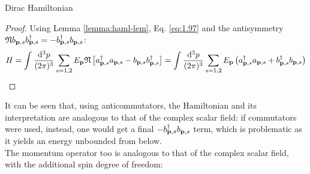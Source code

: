 \begin{proposition}{Dirac Hamiltonian}{}
\begin{proof}
    Using Lemma \ref{lemma:haml-lem}, Eq. \ref{eq:1.97} and the antisymmetry $ \mathfrak{N} b_{\mathbf{p},s} b_{\mathbf{p},s}^\dagger = - b_{\mathbf{p},s}^\dagger b_{\mathbf{p},s} $:
    \begin{equation*}
      H = \int \frac{\mathrm{d}^3p}{(2\pi)^3} \sum_{s = 1,2} E_{\mathbf{p}} \mathfrak{N} \left[ a_{\mathbf{p},s}^\dagger a_{\mathbf{p},s} - b_{\mathbf{p},s} b_{\mathbf{p},s}^\dagger \right] = \int \frac{\mathrm{d}^3p}{(2\pi)^3} \sum_{s = 1,2} E_{\mathbf{p}} \left( a_{\mathbf{p},s}^\dagger a_{\mathbf{p},s} + b_{\mathbf{p},s}^\dagger b_{\mathbf{p},s} \right)
    \end{equation*}
  \end{proof}
\end{proposition}

It can be seen that, using anticommutators, the Hamiltonian and its interpretation are analogous to that of the complex scalar field: if commutators were used, instead, one would get a final $ - b_{\mathbf{p},s}^\dagger b_{\mathbf{p},s} $ term, which is problematic as it yields an energy unbounded from below\footnotemark{}.\\
The momentum operator too is analogous to that of the complex scalar field, with the additional spin degree of freedom:


